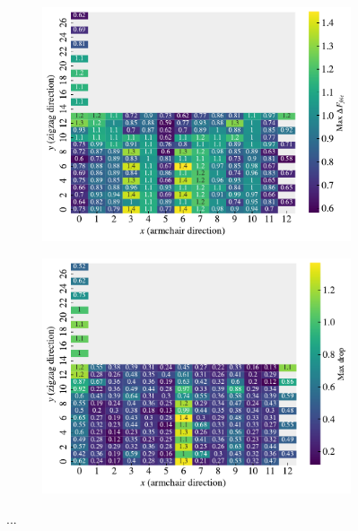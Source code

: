 \begin{figure}[H]
\begin{subfigure}[t]{0.49\textwidth}
      \centering
      \includegraphics[width=\textwidth]{figures/search/ref_search_diff_hon_2_3_3_3_ref_search.pdf}
      \caption{}
  \end{subfigure}
  \hfill
  \begin{subfigure}[t]{0.49\textwidth}
      \centering
      \includegraphics[width=\textwidth]{figures/search/ref_search_drop_hon_2_3_3_3_ref_search.pdf}
      \caption{}
  \end{subfigure}
  \hfill
  \caption{...}
  \label{fig:ref_search_top_data}
\end{figure}








